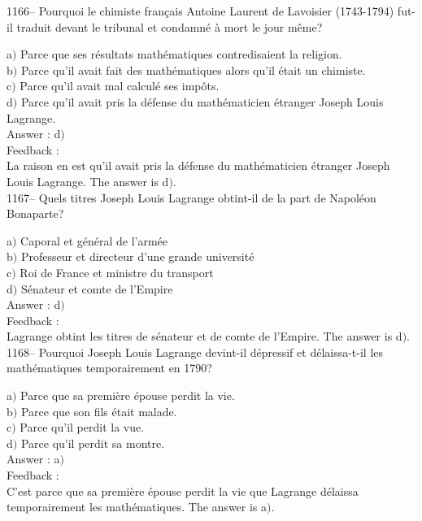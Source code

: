 ﻿\documentclass[letterpaper, 12pt]{article}
\begin{document}
1166-- Pourquoi le chimiste fran\c cais Antoine Laurent de Lavoisier
(1743-1794) fut-il traduit devant le tribunal et condamn\'e \`a mort
le jour m\^eme?

a$)$ Parce que ses r\'esultats math\'ematiques contredisaient la religion.
\\
b$)$ Parce qu'il avait fait des math\'ematiques alors qu'il \'etait un
chimiste. \\
c$)$ Parce qu'il avait mal calcul\'e ses imp\^ots. \\
d$)$ Parce qu'il avait pris la d\'efense du math\'ematicien \'etranger
Joseph Louis Lagrange.\\

Answer : d$)$\\

Feedback : \\
La raison en est qu'il avait pris la d\'efense du math\'ematicien
\'etranger Joseph Louis Lagrange.
The answer is d$)$.\\

1167-- Quels titres Joseph Louis Lagrange obtint-il de la part de
Napol\'eon Bonaparte?

a$)$ Caporal et g\'en\'eral de l'arm\'ee \\
b$)$ Professeur et directeur d'une grande universit\'e \\
c$)$ Roi de France et ministre du transport \\
d$)$ S\'enateur et comte de l'Empire\\

Answer : d$)$\\

Feedback : \\
Lagrange obtint les titres de s\'enateur et de comte de l'Empire.
The answer is d$)$.\\

1168-- Pourquoi Joseph Louis Lagrange devint-il d\'epressif et
d\'elaissa-t-il les math\'ematiques temporairement en 1790?

a$)$ Parce que sa premi\`ere \'epouse perdit la vie. \\
b$)$ Parce que son fils \'etait malade. \\
c$)$ Parce qu'il perdit la vue. \\
d$)$ Parce qu'il perdit sa montre.\\

Answer : a$)$\\

Feedback : \\
C'est parce que sa premi\`ere \'epouse perdit la vie que Lagrange
d\'elaissa temporairement les math\'ematiques.
The answer is a$)$.\\
\end{document}
